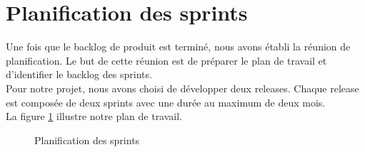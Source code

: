 \begin{comment}
\begin{longtable}[c]{
    |p{.20\textwidth}
    |p{.60\textwidth}|
}
    \caption{Description du diagramme de cas d’utilisation <<Effectuer une prédiction>>}
    \label{tab:tabprediction}\\
    \hline
    
    Cas d’utilisation
    & Effectuer une prédiction. \\
    \hline 
    
    Acteur
    & Utilisateur de Ressource humaine. \\
    \hline 
    
    Pré condition
    & L’utilisateur s’est authentifié. \\
    \hline
    
    Post condition
    & Prédiction effectuée. \\
    \hline
    
    Description du
scénario

    &     \begin{itemize}
    \item L’utilisateur accède à la page de gestion des données des employés.
    \item L’utilisateur peut effectuer une prédiction sur un employé choisi.
    \end{itemize} \\
    \hline
    
   Exception
    & Erreur de connexion.
 \\ \hline
   
\end{longtable}
\end{comment}



\section {Planification des sprints}
Une fois que le backlog de produit est terminé, nous avons établi la réunion de planification. 
Le but de cette réunion est de préparer le plan de travail et d’identifier le backlog des sprints.\\
Pour notre projet, nous avons choisi de développer deux releases. Chaque release est composée de deux sprints avec une durée au maximum de deux mois.\\La figure \ref{fig:Planification_des_sprints} illustre notre
plan de travail.
\newpage
 \begin{figure}[htpb]
\centering
\caption{Planification des sprints}
\label{fig:Planification_des_sprints}
\end{figure}

